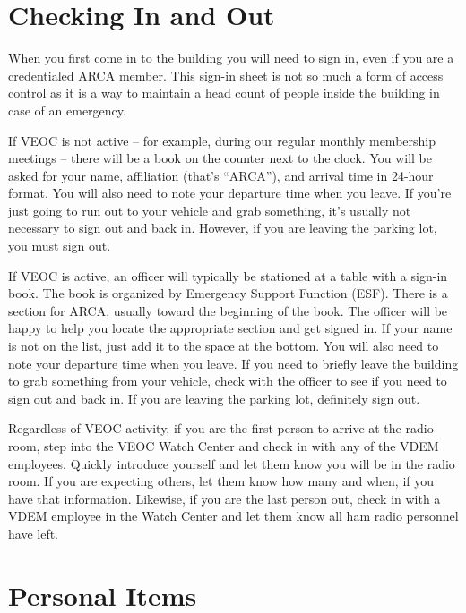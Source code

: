 \documentclass[pdflatex,letterpaper,twoside,12pt]{book}
\begin{document}
\section{Checking In and Out}

When you first come in to the building you will need to sign in, even if you are a credentialed ARCA member.  This sign-in sheet is not so much a form of access control as it is a way to maintain a head count of people inside the building in case of an emergency.

If VEOC is not active – for example, during our regular monthly membership meetings – there will be a book on the counter next to the clock.  You will be asked for your name, affiliation (that's “ARCA”), and arrival time in 24-hour format.  You will also need to note your departure time when you leave.  If you're just going to run out to your vehicle and grab something, it's usually not necessary to sign out and back in.  However, if you are leaving the parking lot, you must sign out.

If VEOC is active, an officer will typically be stationed at a table with a sign-in book.  The book is organized by Emergency Support Function (ESF).  There is a section for ARCA, usually toward the beginning of the book.  The officer will be happy to help you locate the appropriate section and get signed in.  If your name is not on the list, just add it to the space at the bottom.  You will also need to note your departure time when you leave.  If you need to briefly leave the building to grab something from your vehicle, check with the officer to see if you need to sign out and back in.  If you are leaving the parking lot, definitely sign out.

Regardless of VEOC activity, if you are the first person to arrive at the radio room, step into the VEOC Watch Center and check in with any of the VDEM employees.  Quickly introduce yourself and let them know you will be in the radio room.  If you are expecting others, let them know how many and when, if you have that information.  Likewise, if you are the last person out, check in with a VDEM employee in the Watch Center and let them know all ham radio personnel have left.


\section{Personal Items}
\end{document}
